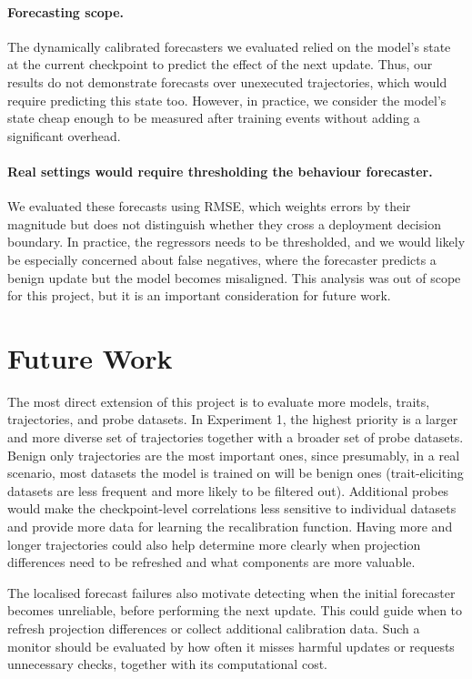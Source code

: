\paragraph{Forecasting scope.}
The dynamically calibrated forecasters we evaluated relied on the model's state at the current checkpoint to predict the effect of the next update. Thus, our results do not demonstrate forecasts over unexecuted trajectories, which would require predicting this state too. However, in practice, we consider the model's state cheap enough to be measured after training events without adding a significant overhead.

\paragraph{Real settings would require thresholding the behaviour forecaster.}
We evaluated these forecasts using RMSE, which weights errors by their magnitude but does not distinguish whether they cross a deployment decision boundary. In practice, the regressors needs to be thresholded, and we would likely be especially concerned about false negatives, where the forecaster predicts a benign update but the model becomes misaligned. This analysis was out of scope for this project, but it is an important consideration for future work.

\section{Future Work}
\label{sec:future-work}

The most direct extension of this project is to evaluate more models, traits, trajectories, and probe datasets. In Experiment 1, the highest priority is a larger and more diverse set of trajectories together with a broader set of probe datasets. Benign only trajectories are the most important ones, since presumably, in a real scenario, most datasets the model is trained on will be benign ones (trait-eliciting datasets are less frequent and more likely to be filtered out). Additional probes would make the checkpoint-level correlations less sensitive to individual datasets and provide more data for learning the recalibration function. Having more and longer trajectories could also help determine more clearly when projection differences need to be refreshed and what components are more valuable.

The localised forecast failures also motivate detecting when the initial forecaster becomes unreliable, before performing the next update. This could guide when to refresh projection differences or collect additional calibration data. Such a monitor should be evaluated by how often it misses harmful updates or requests unnecessary checks, together with its computational cost.

